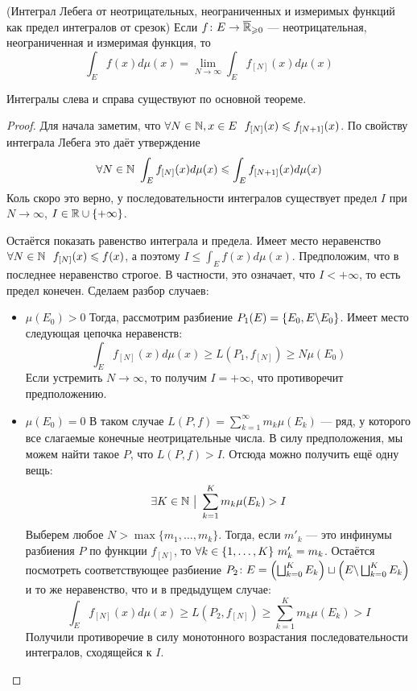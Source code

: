 \begin{theorem} (Интеграл Лебега от неотрицательных, неограниченных и измеримых функций как предел интегралов от срезок)
	Если $f \colon E \to \overline{\mathbb{R}}_{\geqslant 0}$ --- неотрицательная, неограниченная и измеримая функция, то
	\[
		\int_E f(x)d\mu(x) = \lim_{N \to \infty} \int_E f_{[N]}(x)d\mu(x)
	\]
\end{theorem}

\begin{note}
	Интегралы слева и справа существуют по основной теореме.
\end{note}

\begin{proof}
	Для начала заметим, что $\forall N \in \mathbb{N}, x \in E\ \ f_{[N]}(x) \leqslant f_{[N + 1]}(x)$. По свойству интеграла Лебега это даёт утверждение
	\[
		\forall N \in \mathbb{N}\ \int_E f_{[N]}(x)d\mu(x) \leqslant \int_E f_{[N + 1]}(x)d\mu(x)
	\]
	Коль скоро это верно, у последовательности интегралов существует предел $I$ при $N \to \infty$, $I \in \mathbb{R} \cup \{+\infty\}$.
	
	Остаётся показать равенство интеграла и предела. Имеет место неравенство $\forall N \in \mathbb{N}\ \  f_{[N]}(x) \leqslant f(x)$, а поэтому $I \le \int_E f(x)d\mu(x)$. Предположим, что в последнее неравенство строгое. В частности, это означает, что $I < +\infty$, то есть предел конечен. Сделаем разбор случаев:
	\begin{itemize}
		\item $\mu(E_0) > 0$ Тогда, рассмотрим разбиение $P_1(E) = \{E_0, E \backslash E_0\}$. Имеет место следующая цепочка неравенств:
		\[
			\int_E f_{[N]}(x)d\mu(x) \ge L(P_1, f_{[N]}) \ge N\mu(E_0)
		\]
		Если устремить $N \to \infty$, то получим $I = +\infty$, что противоречит предположению.
		
		\item $\mu(E_0) = 0$ В таком случае $L(P, f) = \sum_{k = 1}^\infty m_k \mu(E_k)$ --- ряд, у которого все слагаемые конечные неотрицательные числа. В силу предположения, мы можем найти такое $P$, что $L(P, f) > I$. Отсюда можно получить ещё одну вещь:
		\[
			\exists K \in \mathbb{N} \ \big|\  \sum_{k = 1}^K m_k \mu(E_k) > I
		\]
		Выберем любое $N > \max \{m_1, \ldots, m_k\}$. Тогда, если $m'_k$ --- это инфинумы разбиения $P$ по функции $f_{[N]}$, то $\forall k \in \{1, \ldots, K\}\ m'_k = m_k$. Остаётся посмотреть соответствующее разбиение $P_2 \colon E = \left(\bigsqcup_{k = 0}^K E_k\right) \sqcup \left(E \backslash \bigsqcup_{k = 0}^K E_k\right)$ и то же неравенство, что и в предыдущем случае:
		\[
			\int_E f_{[N]}(x)d\mu(x) \ge L(P_2, f_{[N]}) \ge \sum_{k = 1}^K m_k \mu(E_k) > I
		\]
		Получили противоречие в силу монотонного возрастания последовательности интегралов, сходящейся к $I$.
	\end{itemize}
\end{proof}


